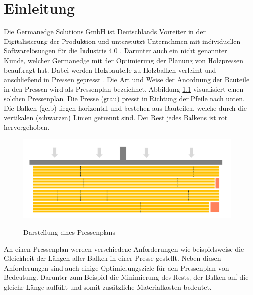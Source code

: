 \chapter{Einleitung}
\label{chapter:Einleitung}

Die Germanedge Solutions GmbH ist Deutschlands Vorreiter in der Digitalisierung der Produktion und
unterstützt Unternehmen mit individuellen Softwarelösungen für die Industrie 4.0 \cite{industry4dot0}.
Darunter auch ein nicht genannter Kunde, welcher Germanedge mit der Optimierung der Planung von Holzpressen beauftragt hat.
Dabei werden Holzbauteile zu Holzbalken verleimt und anschließend in Pressen gepresst .
Die Art und Weise der Anordnung der Bauteile in den Pressen wird als Pressenplan bezeichnet.
Abbildung \ref{figure:pressenplan} visualisiert einen solchen Pressenplan.
Die Presse (grau) presst in Richtung der Pfeile nach unten.
Die Balken (gelb) liegen horizontal und bestehen aus Bauteilen, welche durch die vertikalen (schwarzen) Linien getrennt sind.
Der Rest jedes Balkens ist rot hervorgehoben.

\begin{figure}[h]
    \centering
    \includegraphics[width=1.00\textwidth, center]{Images/Pressenplan}\\
    \caption{Darstellung eines Pressenplans }
    \label{figure:pressenplan}
\end{figure}

An einen Pressenplan werden verschiedene Anforderungen wie beispielsweise die Gleichheit der Längen aller Balken in einer Presse gestellt.
Neben diesen Anforderungen sind auch einige Optimierungsziele für den Pressenplan von Bedeutung.
Darunter zum Beispiel die Minimierung des Rests, der Balken auf die gleiche Länge auffüllt und somit zusätzliche Materialkosten bedeutet.

